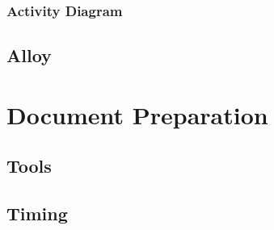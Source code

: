 \documentclass[11pt,a4paper]{report}
\begin{document}
\subsection{Activity Diagram}
\section{Alloy}
\chapter{Document Preparation}
\section{Tools}
\section{Timing}



\end{document}
